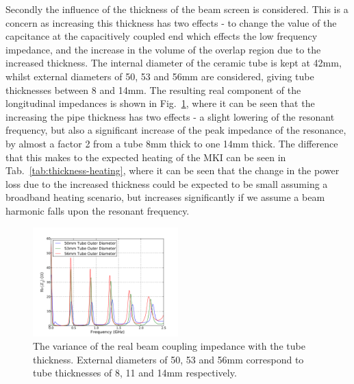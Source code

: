 Secondly the influence of the thickness of the beam screen is considered. This is a concern as increasing this thickness has two effects - to change the value of the capcitance at the capacitively coupled end which effects the low frequency impedance, and the increase in the volume of the overlap region due to the increased thickness. The internal diameter of the ceramic tube is kept at 42mm, whilst external diameters of 50, 53 and 56mm are considered, giving tube thicknesses between 8 and 14mm. The resulting real component of the longitudinal impedances is shown in Fig.~\ref{fig:tube-thickness-imp}, where it can be seen that the increasing the pipe thickness has two effects - a slight lowering of the resonant frequency, but also a significant increase of the peak impedance of the resonance, by almost a factor 2 from a tube 8mm thick to one 14mm thick. The difference that this makes to the expected heating of the MKI can be seen in Tab.~\ref{tab:thickness-heating}, where it can be seen that the change in the power loss due to the increased thickness could be expected to be small assuming a broadband heating scenario, but increases significantly if we assume a beam harmonic falls upon the resonant frequency.

\begin{figure}
\begin{center}
\includegraphics[width=0.5\textwidth]{LHC_MKI/figures/mki-tube-thickness-real.pdf}
\end{center}
\label{fig:tube-thickness-imp}
\caption{The variance of the real beam coupling impedance with the tube thickness. External diameters of 50, 53 and 56mm correspond to tube thicknesses of 8, 11 and 14mm respectively.}
\end{figure}

